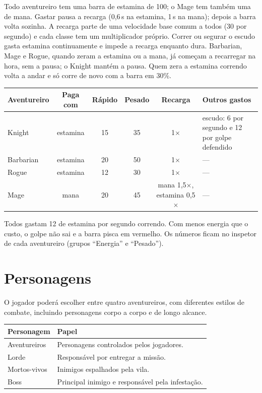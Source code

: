\documentclass[11pt,a4paper]{article}
\begin{document}
Todo aventureiro tem uma barra de estamina de 100; o Mage tem também uma de mana. Gastar pausa a recarga (0,6\,s na estamina, 1\,s na mana); depois a barra volta sozinha. A recarga parte de uma velocidade base comum a todos (30 por segundo) e cada classe tem um multiplicador próprio. Correr ou segurar o escudo gasta estamina continuamente e impede a recarga enquanto dura. Barbarian, Mage e Rogue, quando zeram a estamina ou a mana, já começam a recarregar na hora, sem a pausa; o Knight mantém a pausa. Quem zera a estamina correndo volta a andar e só corre de novo com a barra em 30\%.

\begin{tabularx}{\textwidth}{@{}lccccX@{}}
\toprule
\textbf{Aventureiro} & \textbf{Paga com} & \textbf{Rápido} & \textbf{Pesado} & \textbf{Recarga} & \textbf{Outros gastos} \\
\midrule
Knight    & estamina & 15 & 35 & 1$\times$ & escudo: 6 por segundo e 12 por golpe defendido \\
Barbarian & estamina & 20 & 50 & 1$\times$ & --- \\
Rogue     & estamina & 12 & 30 & 1$\times$ & --- \\
Mage      & mana     & 20 & 45 & mana 1,5$\times$, estamina 0,5$\times$ & --- \\
\bottomrule
\end{tabularx}

Todos gastam 12 de estamina por segundo correndo. Com menos energia que o custo, o golpe não sai e a barra pisca em vermelho. Os números ficam no inspetor de cada aventureiro (grupos ``Energia'' e ``Pesado'').

\section{Personagens}

O jogador poderá escolher entre quatro aventureiros, com diferentes estilos de combate, incluindo personagens corpo a corpo e de longo alcance.

\begin{tabularx}{\textwidth}{@{}lX@{}}
\toprule
\textbf{Personagem} & \textbf{Papel} \\
\midrule
Aventureiros & Personagens controlados pelos jogadores. \\
Lorde & Responsável por entregar a missão. \\
Mortos-vivos & Inimigos espalhados pela vila. \\
Boss & Principal inimigo e responsável pela infestação. \\
\bottomrule
\end{tabularx}
\end{document}
